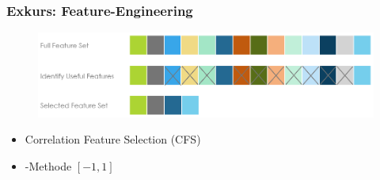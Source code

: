 \documentclass{beamer}
\begin{document}
\begin{frame}
  \frametitle{Exkurs: Feature-Engineering}

  \begin{figure}
    \centering
    \includegraphics[width=\textwidth]{images/feature_engineering.png}
  \end{figure}

  \begin{itemize}
    \item Correlation Feature Selection (CFS)
    \item {}-Methode $[-1, 1]$
  \end{itemize}  
\end{frame}
\end{document}
